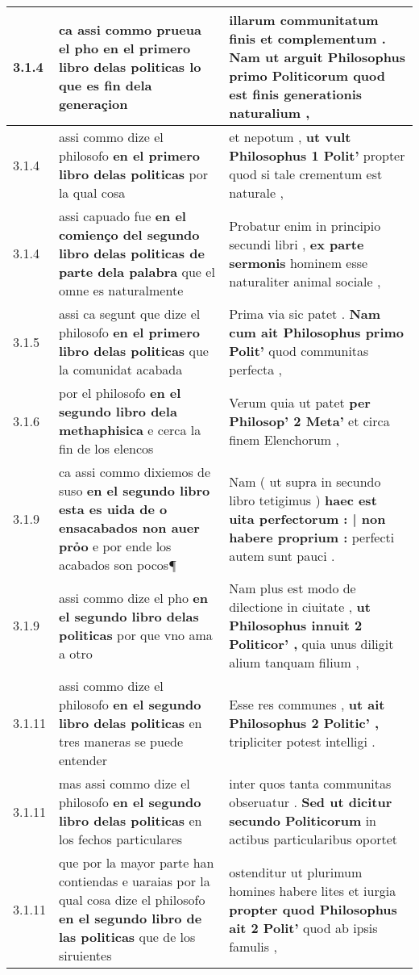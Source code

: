 \begin{tabular}{|p{1cm}|p{6.5cm}|p{6.5cm}|}
3.1.4 & ca assi commo prueua el pho \textbf{ en el primero libro delas politicas } lo que es fin dela generaçion & illarum communitatum finis et complementum . \textbf{ Nam ut arguit Philosophus primo Politicorum } quod est finis generationis naturalium , \\\hline
3.1.4 & assi commo dize el philosofo \textbf{ en el primero libro delas politicas } por la qual cosa & et nepotum , \textbf{ ut vult Philosophus 1 Polit’ } propter quod si tale crementum est naturale , \\\hline
3.1.4 & assi capuado fue \textbf{ en el comienço del segundo libro delas politicas de parte dela palabra } que el omne es naturalmente & Probatur enim in principio secundi libri , \textbf{ ex parte sermonis } hominem esse naturaliter animal sociale , \\\hline
3.1.5 & assi ca segunt que dize el philosofo \textbf{ en el primero libro delas politicas } que la comunidat acabada & Prima via sic patet . \textbf{ Nam cum ait Philosophus primo Polit’ } quod communitas perfecta , \\\hline
3.1.6 & por el philosofo \textbf{ en el segundo libro dela methaphisica } e cerca la fin de los elencos & Verum quia ut patet \textbf{ per Philosop’ 2 Meta’ } et circa finem Elenchorum , \\\hline
3.1.9 & ca assi commo dixiemos de suso \textbf{ en el segundo libro esta es uida de o ensacabados non auer prỏo } e por ende los acabados son pocos¶ & Nam ( ut supra in secundo libro tetigimus ) \textbf{ haec est uita perfectorum : | non habere proprium : } perfecti autem sunt pauci . \\\hline
3.1.9 & assi commo dize el pho \textbf{ en el segundo libro delas politicas } por que vno ama a otro & Nam plus est modo de dilectione in ciuitate , \textbf{ ut Philosophus innuit 2 Politicor’ , } quia unus diligit alium tanquam filium , \\\hline
3.1.11 & assi commo dize el philosofo \textbf{ en el segundo libro delas politicas } en tres maneras se puede entender & Esse res communes , \textbf{ ut ait Philosophus 2 Politic’ , } tripliciter potest intelligi . \\\hline
3.1.11 & mas assi commo dize el philosofo \textbf{ en el segundo libro delas politicas } en los fechos particulares & inter quos tanta communitas obseruatur . \textbf{ Sed ut dicitur secundo Politicorum } in actibus particularibus oportet \\\hline
3.1.11 & que por la mayor parte han contiendas e uaraias por la qual cosa dize el philosofo \textbf{ en el segundo libro de las politicas } que de los siruientes & ostenditur ut plurimum homines habere lites et iurgia \textbf{ propter quod Philosophus ait 2 Polit’ } quod ab ipsis famulis , \\\hline

\end{tabular}

